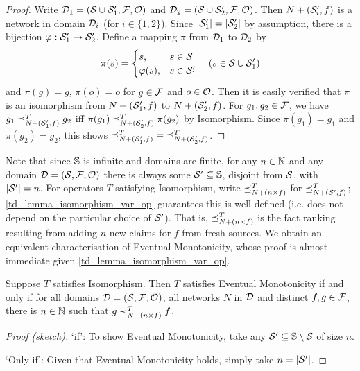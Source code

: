 \begin{proof}
    Write $\D_1 = (\S \cup \S'_1, \F, \O)$ and $\D_2 = (\S \cup \S'_2, \F,
    \O)$. Then $N + (\S'_i, f)$ is a network in domain $\D_i$ (for $i \in \{1,
    2\}$). Since $|\S'_1| = |\S'_2|$ by assumption, there is a bijection $\phi:
    \S'_1 \to \S'_2$. Define a mapping $\pi$ from $\D_1$ to $\D_2$ by
    \[
        \pi(s) = \begin{cases}
            s,& s \in \S \\
            \phi(s),& s \in \S'_1
        \end{cases}
        \quad (s \in \S \cup \S'_1)
    \]
    and $\pi(g) = g$, $\pi(o) = o$ for $g \in \F$ and $o \in \O$. Then it is
    easily verified that $\pi$ is an isomorphism from $N + (\S'_1, f)$ to $N +
    (\S'_2, f)$. For $g_1, g_2 \in \F$, we have $g_1 \fle_{N + (\S'_1, f)}^T
    g_2$ iff $\pi(g_1) \fle_{N + (\S'_2, f)}^T \pi(g_2)$ by Isomorphism. Since
    $\pi(g_1) = g_1$ and $\pi(g_2) = g_2$, this shows ${\fle_{N + (\S'_1,
    f)}^T} = {{\fle_{N + (\S'_2, f)}^T}}$.
\end{proof}

Note that since $\uS$ is infinite and domains are finite, for any $n \in \Nat$
and any domain $\D = (\S, \F, \O)$ there is always some $\S' \subseteq \uS$,
disjoint from $\S$, with $|\S'| = n$. For operators $T$ satisfying Isomorphism,
write $\fle_{N + (n \times f)}^T$ for $\fle_{N + (\S', f)}^T$;
\cref{td_lemma_isomorphism_var_op} guarantees this is well-defined (i.e. does not
depend on the particular choice of $\S'$). That is, $\fle_{N + (n \times f)}^T$
is the fact ranking resulting from adding $n$ new claims for $f$ from fresh
sources. We obtain an equivalent characterisation of Eventual Monotonicity,
whose proof is almost immediate given \cref{td_lemma_isomorphism_var_op}.

\begin{proposition}
    \label{td_prop_eventual_mon_iff_improvement}
    Suppose $T$ satisfies Isomorphism. Then $T$ satisfies Eventual Monotonicity
    if and only if for all domains $\D = (\S, \F, \O)$, all networks $N$ in
    $\D$ and distinct $f, g \in \F$, there is $n \in \Nat$ such that $g \flt_{N
    + (n \times f)}^T f$.
\end{proposition}

\begin{proof}[Proof (sketch)]
    `if': To show Eventual Monotonicity, take any $\S' \subseteq \uS \setminus
    \S$ of size $n$.

    `Only if': Given that Eventual Monotonicity holds, simply take $n = |\S'|$.
\end{proof}

